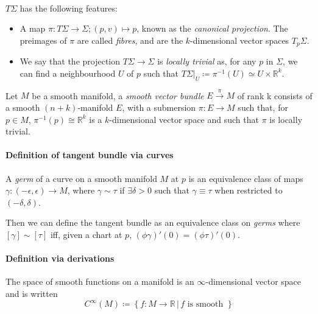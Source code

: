 \documentclass[fleqn, 11pt]{report}
\begin{document}
\paragraph{}
$ T\Sigma $ has the following features:
\begin{itemize}
	\item A map $ \pi: T\Sigma \to \Sigma; (p,v) \mapsto p $, known as the \textsl{canonical projection}. The preimages of $ \pi $ are called \textsl{fibres}, and are the $ k $-dimensional vector spaces $ T_p\Sigma $.
	\item We say that the projection $ T\Sigma \to \Sigma $ is \textsl{locally trivial} as, for any $ p $ in $ \Sigma $, we can find a neighbourhood $ U $ of $ p $ such that $ T\Sigma|_U \coloneqq \pi^{-1}(U) \simeq U \times \mathbb{R}^k $.
\end{itemize}

\begin{definition}
	Let $ M $ be a smooth manifold, a \textsl{smooth vector bundle} $ E \overset{\pi}{\to} M $ of rank k consists of a smooth $ (n+k) $-manifold $ E $, with a submersion $ \pi: E \to M $ such that, for $ p \in M $, $ \pi^{-1}(p) \cong \mathbb{R}^k $ is a $ k $-dimensional vector space and such that $ \pi $ is locally trivial.
\end{definition}

\paragraph{Definition of tangent bundle via curves}
\begin{definition}
	A \textsl{germ} of a curve on a smooth manifold $ M $ at $ p $ is an equivalence class of maps \\ $ {\gamma: (-\epsilon, \epsilon) \to  M } $, where $ \gamma \sim \tau $ if $ \exists \delta > 0 $ such that $ \gamma \equiv \tau $ when restricted to $ (-\delta, \delta) $.
\end{definition}
Then we can define the tangent bundle as an equivalence class on \textit{germs} where $ [\gamma] \sim [\tau] $ iff, given a chart at $ p $, $ (\phi \gamma)'(0) = (\phi \tau)'(0) $.

\paragraph{Definition via derivations}

\begin{definition}
	The space of smooth functions on a manifold is an $ \infty $-dimensional vector space and is written
		\begin{equation}\label{key}
			C^\infty(M) \coloneqq \left\{ f: M \to \mathbb{R} \,|\, f \text{ is smooth } \right\}
		\end{equation}
\end{definition}
\end{document}
